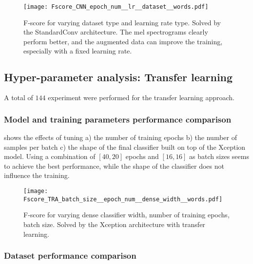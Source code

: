 \begin{figure*}[h!]
    \centering
    \texttt{[image: Fscore\_CNN\_epoch\_num\_\_lr\_\_dataset\_\_words.pdf]}
    \caption{F-score for varying
        dataset type and learning rate type.
        Solved by the StandardConv architecture.
        The mel spectrograms clearly perform better, and the augmented data can
        improve the training, especially with a fixed learning rate.
    }%
    \label{fig:cnn_comparison_epoch_lr_dataset}
\end{figure*}

\subsection{Hyper-parameter analysis: Transfer learning}

A total of $144$ experiment were performed for the transfer learning approach.


\subsubsection{Model and training parameters performance comparison}

 shows the effects of tuning
a)
the number of training epochs
b)
the number of samples per batch
c)
the shape of the final classifier built on top of the Xception model.
Using a combination of $[40, 20]$ epochs and $[16, 16]$ as batch sizes seems to
achieve the best performance, while the shape of the classifier does not
influence the training.


\begin{figure}[h!]
    \centering
    \texttt{[image: Fscore\_TRA\_batch\_size\_\_epoch\_num\_\_dense\_width\_\_words.pdf]}
    \caption{F-score for varying
        dense classifier width,
        number of training epochs,
        batch size.
        Solved by the Xception architecture with transfer learning.
    }%
    \label{fig:tra_comparison_batch_epoch_dense}
\end{figure}

\subsubsection{Dataset performance comparison}

